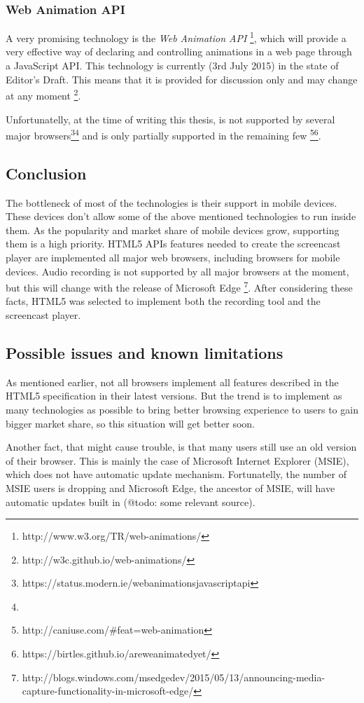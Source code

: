\subsubsection*{Web Animation API}
A very promising technology is the \textit{Web Animation API} \footnote{http://www.w3.org/TR/web-animations/}, which will provide a very effective way of declaring and controlling animations in a web page through a JavaScript API. This technology is currently (3rd July 2015) in the state of Editor's Draft. This means that it is provided for discussion only and may change at any moment \cite{} \footnote{http://w3c.github.io/web-animations/}.

Unfortunatelly, at the time of writing this thesis, is not supported by several major browsers\footnote{https://status.modern.ie/webanimationsjavascriptapi}\footnote{} and is only partially supported in the remaining few \footnote{http://caniuse.com/\#feat=web-animation}\footnote{https://birtles.github.io/areweanimatedyet/}.

\subsection{Conclusion}
The bottleneck of most of the technologies is their support in mobile devices. These devices don't allow some of the above mentioned technologies to run inside them. As the popularity and market share of mobile devices grow, supporting them is a high priority. HTML5 APIs features needed to create the screencast player are implemented all major web browsers, including browsers for mobile devices. Audio recording is not supported by all major browsers at the moment, but this will change with the release of Microsoft Edge \cite{}\footnote{http://blogs.windows.com/msedgedev/2015/05/13/announcing-media-capture-functionality-in-microsoft-edge/}. After considering these facts, HTML5 was selected to implement both the recording tool and the screencast player.

\subsection{Possible issues and known limitations}
As mentioned earlier, not all browsers implement all features described in the HTML5 specification in their latest versions. But the trend is to implement as many technologies as possible to bring better browsing experience to users to gain bigger market share, so this situation will get better soon.

Another fact, that might cause trouble, is that many users still use an old version of their browser. This is mainly the case of Microsoft Internet Explorer (MSIE), which does not have automatic update mechanism. Fortunatelly, the number of MSIE users is dropping and Microsoft Edge, the ancestor of MSIE, will have automatic updates built in (@todo: some relevant source).

